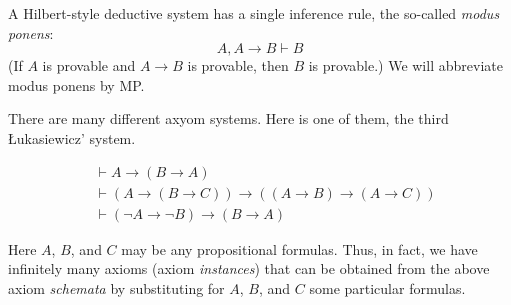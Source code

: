 

\setcounter{section}{2}
\setcounter{subsection}{2}
\setcounter{dfn}{3}

A Hilbert-style deductive system has a single inference rule, the so-called \emph{modus ponens}:
\[
A, A \to B \vdash B
\]
(If $A$ is provable and $A \to B$ is provable, then $B$ is provable.)
We will abbreviate modus ponens by MP.

There are many different axyom systems.
Here is one of them, the third \L{}ukasiewicz' system.

\begin{align*}
&\vdash A \to (B \to A)\\
&\vdash (A \to (B \to C)) \to ((A \to B) \to (A \to C))\\
&\vdash (\neg A \to \neg B) \to (B \to A)
\end{align*}

Here $A$, $B$, and $C$ may be any propositional formulas.
Thus, in fact, we have infinitely many axioms (axiom \emph{instances}) that can be obtained from the above axiom \emph{schemata}
by substituting for $A$, $B$, and $C$ some particular formulas.



